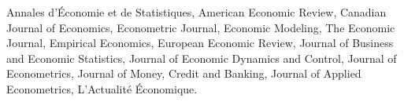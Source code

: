 

\vspace{.5cm}


\vspace{.3cm}



\noindent Annales d'\'Economie et de Statistiques, American Economic
Review, Canadian Journal of Economics, Econometric Journal, Economic
Modeling, The Economic Journal, Empirical Economics, European Economic Review, Journal of
Business and Economic Statistics, Journal of Economic Dynamics and Control, Journal of Econometrics, Journal
of Money, Credit and Banking, Journal of Applied Econometrics, L'Actualit\'e \'Economique.

